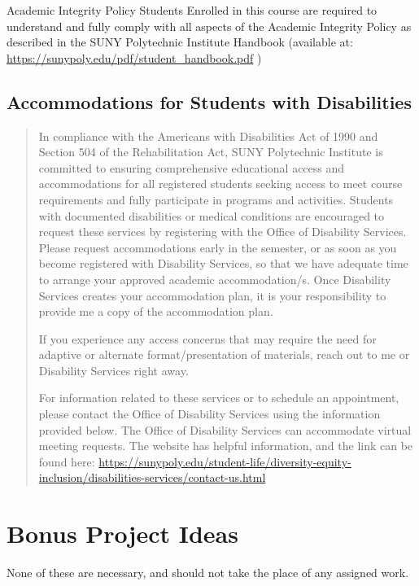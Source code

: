 \documentclass[11pt]{article}
\begin{document}
Academic Integrity Policy Students Enrolled in this course are required to understand and fully comply with all aspects of the Academic Integrity Policy as described in the SUNY Polytechnic Institute Handbook (available at:  \url{https://sunypoly.edu/pdf/student\_handbook.pdf} )
\subsection{Accommodations for Students with Disabilities}
\label{sec:org7e845b3}

\begin{quote}
In compliance with the Americans with Disabilities Act of 1990 and Section 504 of the Rehabilitation Act, SUNY Polytechnic Institute is committed to ensuring comprehensive educational access and accommodations for all registered students seeking access to meet course requirements and fully participate in programs and activities.  Students with documented disabilities or medical conditions are encouraged to request these services by registering with the Office of Disability Services. Please request accommodations early in the semester, or as soon as you become registered with Disability Services, so that we have adequate time to arrange your approved academic accommodation/s.  Once Disability Services creates your accommodation plan, it is your responsibility to provide me a copy of the accommodation plan.

If you experience any access concerns that may require the need for adaptive or alternate format/presentation of materials, reach out to me or Disability Services right away. 

For information related to these services or to schedule an appointment, please contact the Office of Disability Services using the information provided below.  The Office of Disability Services can accommodate virtual meeting requests.  The website has helpful information, and the link can be found here: \url{https://sunypoly.edu/student-life/diversity-equity-inclusion/disabilities-services/contact-us.html}
\end{quote}
\section{Bonus Project Ideas}
\label{sec:orgd0e2a58}

None of these are necessary, and should not take the place of any assigned work.
\end{document}
